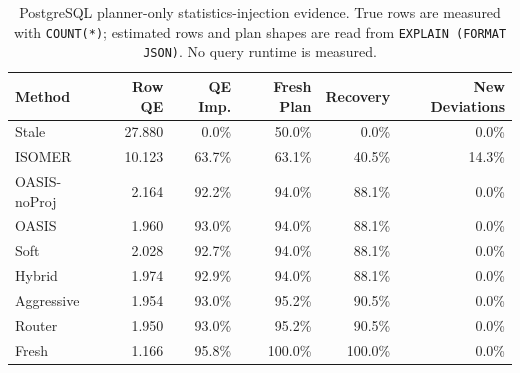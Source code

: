 \begin{table}[t]
  \centering
  \small
  \caption{PostgreSQL planner-only statistics-injection evidence. True rows are measured with \texttt{COUNT(*)}; estimated rows and plan shapes are read from \texttt{EXPLAIN (FORMAT JSON)}. No query runtime is measured.}
  \label{tab:postgres_planner_stats_injection}
  \setlength{\tabcolsep}{4pt}
  \begin{tabular}{lrrrrr}
    \toprule
    Method & Row QE & QE Imp. & Fresh Plan & Recovery & New Deviations \\
    \midrule
    Stale & 27.880 & 0.0\% & 50.0\% & 0.0\% & 0.0\% \\
    ISOMER & 10.123 & 63.7\% & 63.1\% & 40.5\% & 14.3\% \\
    OASIS-noProj & 2.164 & 92.2\% & 94.0\% & 88.1\% & 0.0\% \\
    OASIS & 1.960 & 93.0\% & 94.0\% & 88.1\% & 0.0\% \\
    Soft & 2.028 & 92.7\% & 94.0\% & 88.1\% & 0.0\% \\
    Hybrid & 1.974 & 92.9\% & 94.0\% & 88.1\% & 0.0\% \\
    Aggressive & 1.954 & 93.0\% & 95.2\% & 90.5\% & 0.0\% \\
    Router & 1.950 & 93.0\% & 95.2\% & 90.5\% & 0.0\% \\
    Fresh & 1.166 & 95.8\% & 100.0\% & 100.0\% & 0.0\% \\
    \bottomrule
  \end{tabular}
\end{table}
